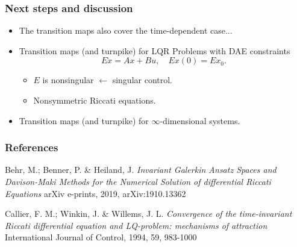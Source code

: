 \documentclass[xcolor=dvipsnames,10pt,hyperref={breaklinks=true}]{beamer}
\begin{document}
\begin{frame}
\frametitle{Next steps and discussion}

\begin{itemize}
  \item The transition maps also cover the time-dependent case...
  \item Transition maps (and turnpike) for LQR Problems with DAE constraints
  \begin{equation*}
    E \dot x = Ax + Bu, \quad Ex(0)=Ex_0.
  \end{equation*}
  \begin{itemize}
    \item $E$ is nonsingular $\leftarrow$ singular control.
    \item Nonsymmetric Riccati equations.
  \end{itemize}
  \item Transition maps (and turnpike) for $\infty$-dimensional systems.
\end{itemize}

\end{frame}

\begin{frame}
  \frametitle{References}

 \vfill

 Behr, M.; Benner, P. \& Heiland, J. \emph{Invariant Galerkin Ansatz Spaces and
   Davison-Maki Methods for the Numerical Solution of differential Riccati
 Equations} arXiv e-prints, 2019, arXiv:1910.13362 

 \vfill

 \hline

 \vfill

 Callier, F. M.; Winkin, J. \& Willems, J. L.  \emph{Convergence of the
   time-invariant Riccati differential equation and LQ-problem: mechanisms of
 attraction} International Journal of Control, 1994, 59, 983-1000 

 \vfill

\end{frame}

\end{document}
